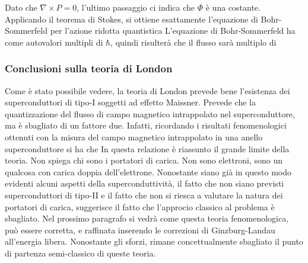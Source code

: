 Dato che $\nabla\times P = 0$, l'ultimo passaggio ci indica che $\Phi$ \`e una costante. Applicando il teorema di Stokes, si ottiene esattamente l'equazione di Bohr-Sommerfeld per l'azione ridotta quantistica
L'equazione di Bohr-Sommerfeld ha come autovalori multipli di $\hbar$, quindi risulter\`a che il flusso sar\`a multiplo di
\subsubsection{Conclusioni sulla teoria di London}
Come \`e stato possibile vedere, la teoria di London prevede bene l'esistenza dei superconduttori di tipo-I soggetti ad effetto Maissner. Prevede che la quantizzazione del flusso di campo magnetico intrappolato nel superconduttore, ma \`e sbagliato di un fattore due. Infatti, ricordando i risultati fenomenologici ottenuti con la misura del campo magnetico intrappolato in una anello superconduttore si ha che 
In questa relazione \`e riassunto il grande limite della teoria. Non spiega chi sono i portatori di carica. Non sono elettroni, sono un qualcosa con carica doppia dell'elettrone. Nonostante siano gi\`a in questo modo evidenti alcuni aspetti della superconduttivit\`a, il fatto che non siano previsti superconduttori di tipo-II e il fatto che non si riesca a valutare la natura dei portatori di carica, suggerisce il fatto che l'approcio classico al problema \`e sbagliato. Nel prossimo paragrafo si vedr\`a come questa teoria fenomenologica, pu\`o essere corretta, e raffinata inserendo le correzioni di Ginzburg-Landau all'energia libera. Nonostante gli sforzi, rimane concettualmente sbagliato il punto di partenza semi-classico di queste teoria.
